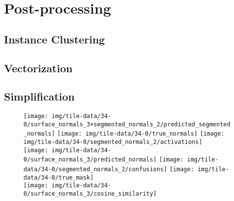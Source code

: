 \chapter{Post-processing}%
\label{chap:post-processing}



\section{Instance Clustering}


\section{Vectorization}


\section{Simplification}


\begin{figure}
  \centering
  \texttt{[image: img/tile-data/34-0/surface\_normals\_3+segmented\_normals\_2/predicted\_segmented\_normals]}
  \texttt{[image: img/tile-data/34-0/true\_normals]}
  \texttt{[image: img/tile-data/34-0/segmented\_normals\_2/activations]}
  \\
  \texttt{[image: img/tile-data/34-0/surface\_normals\_3/predicted\_normals]}
  \texttt{[image: img/tile-data/34-0/segmented\_normals\_2/confusions]}
  \texttt{[image: img/tile-data/34-0/true\_mask]}
  \\
  \hspace{2.15em}\texttt{[image: img/tile-data/34-0/surface\_normals\_3/cosine\_similarity]}
\end{figure}

